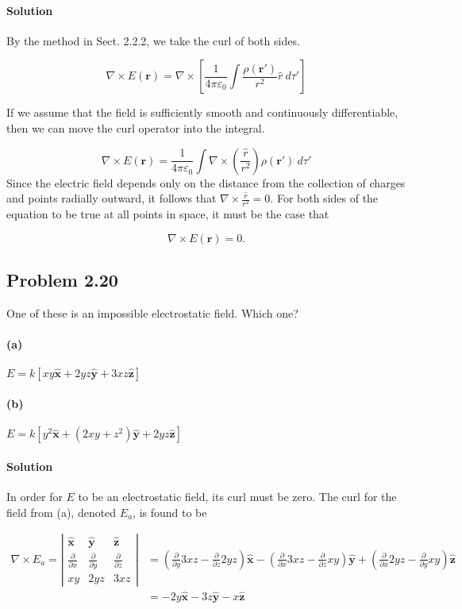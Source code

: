 \documentclass{article}
\newcommand{\bvec}[1]{\mathbf{\hat{#1}}}
\begin{document}
\paragraph{Solution} By the method in Sect. 2.2.2, we take the curl of both sides. 

$$
\nabla \times E(\mathbf{r}) = \nabla \times \left[\frac{1}{4\pi \varepsilon_0}\int \frac{\rho(\mathbf{r}')}{r^2}\hat{r}\ d\tau'\right]
$$

If we assume that the field is sufficiently smooth and continuously differentiable, then we can move the curl operator into the integral.

$$
\nabla \times E(\mathbf{r}) = \frac{1}{4\pi \varepsilon_0}\int \nabla \times \left ( \frac{\hat{r}}{r^2}\right)\rho(\mathbf{r}')\ d\tau'
$$
Since the electric field depends only on the distance from the collection of charges and points radially outward, it follows that $\nabla \times \frac{\hat{r}}{r^2} = 0$. For both sides of the equation to be true at all points in space, it must be the case that 

$$
\nabla \times E(\mathbf{r}) = 0.
$$

\newpage

\subsection*{Problem 2.20}
One of these is an impossible electrostatic field. Which one?

\paragraph{(a)} $E = k[xy\mathbf{\hat{x}}+2yz\mathbf{\hat{y}}+3xz\mathbf{\hat{z}}]$
\paragraph{(b)} $E = k[y^2\bvec{x} +(2xy+z^2)\bvec{y}+2yz\bvec{z}]$

\paragraph{Solution} In order for $E$ to be an electrostatic field, its curl must be zero. The curl for the field from (a), denoted $E_a$, is found to be

\begin{align*}
    \nabla \times E_a = \left | \begin{array}{ccc}
         \bvec{x}& \bvec{y} & \bvec{z}  \\
         \frac{\partial}{\partial x} & \frac{\partial}{\partial y} & \frac{\partial}{\partial z}\\ 
         xy & 2yz & 3xz
    \end{array} \right | &= \left(\frac{\partial}{\partial y}3xz - \frac{\partial}{\partial z}2yz\right)\bvec{x} - \left(\frac{\partial}{\partial x}3xz - \frac{\partial}{\partial z}xy\right)\bvec{y} + \left(\frac{\partial }{\partial x}2yz - \frac{\partial}{\partial y}xy\right)\bvec{z} \\
    &= -2y\bvec{x} - 3z\bvec{y} - x\bvec{z}
\end{align*}
\end{document}
